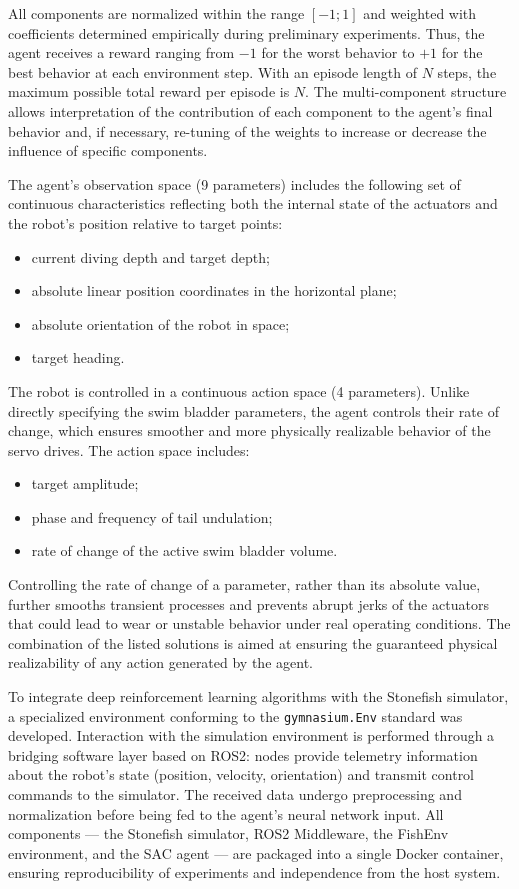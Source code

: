 \documentclass[12pt]{revtex4}
\begin{document}
All components are normalized within the range $[-1; 1]$ and weighted with coefficients determined empirically during preliminary experiments. Thus, the agent receives a reward ranging from $-1$ for the worst behavior to $+1$ for the best behavior at each environment step. With an episode length of $N$ steps, the maximum possible total reward per episode is $N$. The multi-component structure allows interpretation of the contribution of each component to the agent's final behavior and, if necessary, re-tuning of the weights to increase or decrease the influence of specific components.

The agent's observation space (9 parameters) includes the following set of continuous characteristics reflecting both the internal state of the actuators and the robot's position relative to target points:
\begin{itemize}
\item current diving depth and target depth;
\item absolute linear position coordinates in the horizontal plane;
\item absolute orientation of the robot in space;
\item target heading.
\end{itemize}

The robot is controlled in a continuous action space (4 parameters). Unlike directly specifying the swim bladder parameters, the agent controls their rate of change, which ensures smoother and more physically realizable behavior of the servo drives. The action space includes:
\begin{itemize}
\item target amplitude;
\item phase and frequency of tail undulation;
\item rate of change of the active swim bladder volume.
\end{itemize}

Controlling the rate of change of a parameter, rather than its absolute value, further smooths transient processes and prevents abrupt jerks of the actuators that could lead to wear or unstable behavior under real operating conditions. The combination of the listed solutions is aimed at ensuring the guaranteed physical realizability of any action generated by the agent.

To integrate deep reinforcement learning algorithms with the Stonefish simulator, a specialized environment conforming to the \texttt{gymnasium.Env} standard was developed. Interaction with the simulation environment is performed through a bridging software layer based on ROS2: nodes provide telemetry information about the robot's state (position, velocity, orientation) and transmit control commands to the simulator. The received data undergo preprocessing and normalization before being fed to the agent's neural network input. All components --- the Stonefish simulator, ROS2 Middleware, the FishEnv environment, and the SAC agent --- are packaged into a single Docker container, ensuring reproducibility of experiments and independence from the host system.
\end{document}
